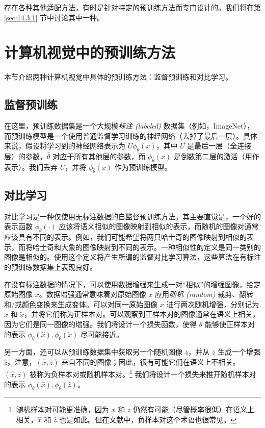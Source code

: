 存在各种其他适配方法，有时是针对特定的预训练方法而专门设计的。我们将在第 \ref{sec:14.3.1} 节中讨论其中一种。

\section{计算机视觉中的预训练方法}

本节介绍两种计算机视觉中具体的预训练方法：监督预训练和对比学习。

\subsection*{监督预训练}

在这里，预训练数据集是一个大规模\textit{标注 (labeled)} 数据集（例如，ImageNet），而预训练模型是一个使用普通监督学习训练的神经网络（去掉了最后一层）。具体来说，假设将学习到的神经网络表示为 $U \phi_{\hat{\theta}}(x)$，其中 $U$ 是最后一层（全连接层）的参数，$\hat{\theta}$ 对应于所有其他层的参数，而 $\phi_{\hat{\theta}}(x)$ 是倒数第二层的激活（用作表示）。我们丢弃 $U$，并将 $\phi_{\hat{\theta}}(x)$ 作为预训练模型。

\subsection*{对比学习}

对比学习是一种仅使用无标注数据的自监督预训练方法。其主要直觉是，一个好的表示函数 $\phi_\theta(\cdot)$ 应该将语义相似的图像映射到相似的表示，而随机的图像对通常应该具有不同的表示。例如，我们可能希望将两只哈士奇的图像映射到相似的表示，而将哈士奇和大象的图像映射到不同的表示。一种相似性的定义是同一类别的图像是相似的。使用这个定义将产生所谓的监督对比学习算法，这些算法在有标注的预训练数据集上表现良好。

在没有标注数据的情况下，可以使用数据增强来生成一对“相似”的增强图像，给定原始图像 $x$。数据增强通常意味着对原始图像 $x$ 应用\textit{随机 (random)} 裁剪、翻转和/或颜色变换来生成变体。可以对同一原始图像 $x$ 进行两次随机增强，分别记为 $\hat{x}$ 和 $\tilde{x}$，并将它们称为正样本对。可以观察到正样本对的图像通常在语义上相关，因为它们是同一图像的增强。我们将设计一个损失函数，使得 $\theta$ 能够使正样本对的表示 $\phi_\theta(\hat{x}), \phi_\theta(\tilde{x})$ 尽可能接近。

另一方面，还可以从预训练数据集中获取另一个随机图像 $z$，并从 $z$ 生成一个增强 $\hat{z}$。注意，$(\hat{x}, \hat{z})$ 来自不同的图像；因此，很有可能它们在语义上不相关。$(\hat{x}, \hat{z})$ 被称为负样本对或随机样本对。\footnote{随机样本对可能更准确，因为 $x$ 和 $z$ 仍然有可能（尽管概率很低）在语义上相关，$\hat{x}$ 和 $\hat{z}$ 也是如此。但在文献中，负样本对这个术语也很常见。} 我们将设计一个损失来推开随机样本对的表示 $\phi_\theta(\hat{x}), \phi_\theta(\hat{z})$。

